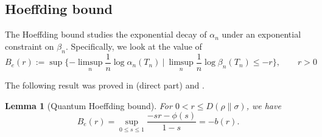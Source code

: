 \documentclass[12pt]{article}
\newtheorem{lemma}{Lemma}
\theoremstyle{definition}
\theoremstyle{remark}
\begin{document}
\subsection{Hoeffding bound}

The Hoeffding bound studies the exponential decay of $\alpha_n$ under an exponential
constraint on $\beta_n$. Specifically, we look at the value of
\[
B_e(r):=\sup \{-\limsup_n \frac1n\log\alpha_n(T_n)\ |\ \limsup_n\frac1n\log \beta_n(T_n)\le -r\},\qquad r>0
\]

The following result was proved in \cite{hayashi2007error} (direct part) and
\cite{nagaoka2006theconverse}. 

\begin{lemma}[Quantum Hoeffding bound]  For $0<r\le D(\rho\|\sigma)$, we have
\[
B_e(r)=\sup_{0\le s\le 1}\frac{-sr-\phi(s)}{1-s}=-b(r).
\]


\end{lemma}
\end{document}
